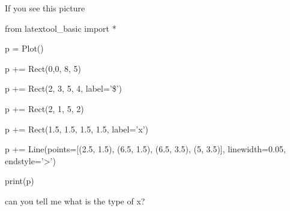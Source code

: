 If you see this picture

\begin{python}

from latextool_basic import *

p = Plot()



p += Rect(0,0, 8, 5)

p += Rect(2, 3, 5, 4, label='\$')

p += Rect(2, 1, 5, 2)

p += Rect(1.5, 1.5, 1.5, 1.5, label='x')

p += Line(points=[(2.5, 1.5), (6.5, 1.5), (6.5, 3.5), (5, 3.5)], linewidth=0.05, endstyle='>')



print(p)

\end{python}



can you tell me what is the type of x?

